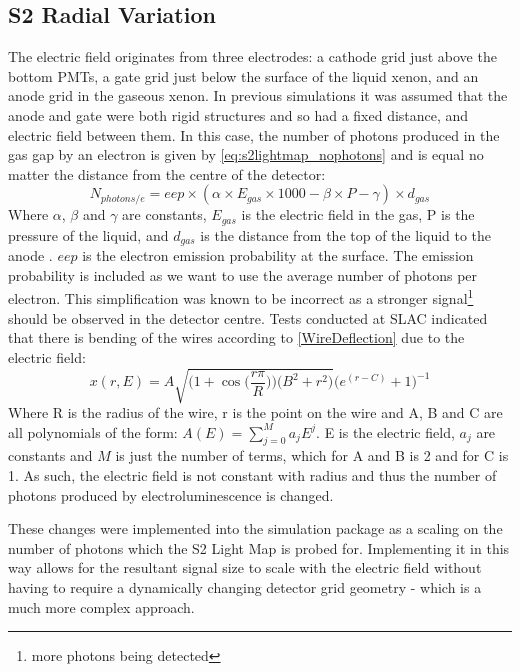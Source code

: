 \subsection{S2 Radial Variation} \label{sec:s2radialvariation}
\par
The electric field originates from three electrodes: a cathode grid just above the bottom PMTs, a gate grid just below the surface of the liquid xenon, and an anode grid in the gaseous xenon.
In previous simulations it was assumed that the anode and gate were both rigid structures and so had a fixed distance, and electric field between them.
In this case, the number of photons produced in the gas gap by an electron is given by \autoref{eq:s2lightmap_nophotons} and is equal no matter the distance from the centre of the detector:
\begin{equation}
    N_{photons/e} = eep \times (\alpha \times E_{gas} \times 1000 - \beta \times P - \gamma) \times d_{gas}
    \label{eq:s2lightmap_nophotons}
\end{equation}
Where $\alpha$, $\beta$ and $\gamma$ are constants, $E_{gas}$ is the electric field in the gas, P is the pressure of the liquid, and $d_{gas}$ is the distance from the top of the liquid to the anode \cite{NoPhotonsPerElectron}.
$eep$ is the electron emission probability at the surface.
The emission probability is included as we want to use the average number of photons per electron.
This simplification was known to be incorrect as a stronger signal\footnote{more photons being detected} should be observed in the detector centre.
Tests conducted at SLAC indicated that there is bending of the wires according to \autoref{WireDeflection} due to the electric field:
\begin{equation}
    x(r,E) = A \sqrt{ \bigg( 1 + \cos{ \Big( \frac{r \pi}{R} } \Big) \bigg) \bigg( B^2 + r^2 \bigg) } \bigg( e^{(r-C)} + 1 \bigg)^{-1} 
    \label{WireDeflection}
\end{equation}
Where R is the radius of the wire, r is the point on the wire and A, B and C are all polynomials of the form: $A(E) = \sum_{j=0}^{M} a_{j} E^{j}$. E is the electric field, $a_{j}$ are constants and $M$ is just the number of terms, which for A and B is 2 and for C is 1.
As such, the electric field is not constant with radius and thus the number of photons produced by electroluminescence is changed.
\par
These changes were implemented into the simulation package as a scaling on the number of photons which the S2 Light Map is probed for.
Implementing it in this way allows for the resultant signal size to scale with the electric field without having to require a dynamically changing detector grid geometry - which is a much more complex approach.
